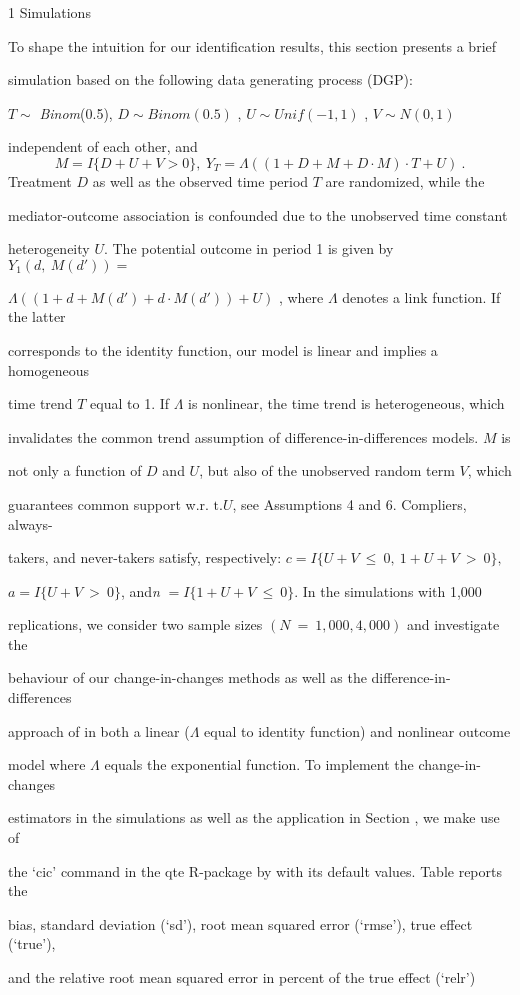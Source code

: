 \documentclass[a4paper,12pt]{article}
\begin{document}
1 Simulations

To shape the intuition for our identification results, this section presents a brief

simulation based on the following data generating process (DGP):

$ T\sim$ {\it Binom}(0.5), $D\sim Binom(0.5)$ , $U\sim Unif(-1,1)$ , $V\sim N(0,1)$

independent of each other, and
$$
M=I\{D+U+V>0\},\ Y_{T}=\Lambda((1+D+M+D\cdot M)\cdot T+U)\ .
$$
Treatment $D$ as well as the observed time period $T$ are randomized, while the

mediator-outcome association is confounded due to the unobserved time constant

heterogeneity $U$. The potential outcome in period 1 is given by $Y_{1}(d,\ M(d')) =$

$\Lambda((1+d+M(d')+d\cdot M(d'))+U)$ , where $\Lambda$ denotes a link function. If the latter

corresponds to the identity function, our model is linear and implies a homogeneous

time trend $T$ equal to 1. If $\Lambda$ is nonlinear, the time trend is heterogeneous, which

invalidates the common trend assumption of difference-in-differences models. $M$ is

not only a function of $D$ and $U$, but also of the unobserved random term $V$, which

guarantees common support w.r. $\mathrm{t}. U$, see Assumptions 4 and 6. Compliers, always-

takers, and never-takers satisfy, respectively: $c= I\{U+V\ \leq\ 0,\ 1+U+V\ >\ 0\},$

$a = I\{U+V\ >\ 0\}$, and{\it n} $= I\{1+U+V\ \leq\ 0\}$. In the simulations with 1,000

replications, we consider two sample sizes $(N\ =\ 1,000,4,000)$ and investigate the

behaviour of our change-in-changes methods as well as the difference-in-differences

approach of in both a linear ($\Lambda$ equal to identity function) and nonlinear outcome

model where $\Lambda$ equals the exponential function. To implement the change-in-changes

estimators in the simulations as well as the application in Section , we make use of

the ‘cic’ command in the qte $\mathrm{R}$-package by with its default values. Table reports the

bias, standard deviation (‘sd’), root mean squared error (‘rmse’), true effect (‘true’),

and the relative root mean squared error in percent of the true effect (‘relr’)
\end{document}
